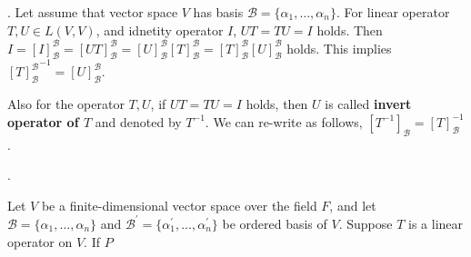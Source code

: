\documentclass[8pt]{beamer}
\newcommand{\mc}[1]{\mathcal{#1}}
\newcommand{\tb}[1]{\textbf{#1}}
\begin{document}
\begin{frame}{.}
    Let assume that vector space $V$ has basis $\mc{B} =\{\alpha_1, \dots, \alpha_n\}$.
    For linear operator $T, U \in L(V,V)$, and idnetity operator $I$, $UT =TU = I$ holds.
    Then $I = [I]^{\mc{B}}_{\mc{B}} = [UT]^{\mc{B}}_{\mc{B}} = [U]^{\mc{B}}_{\mc{B}} [T]^{\mc{B}}_{\mc{B}} = [T]^{\mc{B}}_{\mc{B}} [U]^{\mc{B}}_{\mc{B}}$ holds.
    This implies ${[T]^{\mc{B}}_{\mc{B}}}^{-1} = [U]^{\mc{B}}_{\mc{B}}$.

    Also for the operator $T,U$, if $U T = T U = I$ holds, then $U$ is called \tb{invert operator of $T$} and denoted by $T^{-1}$.
    We can re-write as follows, $[T^{-1}]_{\mc{B}} = [T]_{\mc{B}}^{-1}$.
\end{frame}

\begin{frame}{.}
    \begin{theorem}
        Let $V$ be a finite-dimensional vector space over the field $F$, and let $\mc{B} = \{\alpha_1, \dots, \alpha_n\}$ and $\mc{B}^\prime = \{\alpha_1^\prime, \dots, \alpha_n^\prime\}$ be ordered basis of $V$.
        Suppose $T$ is a linear operator on $V$.
        If $P$
    \end{theorem}
\end{frame}
\end{document}
